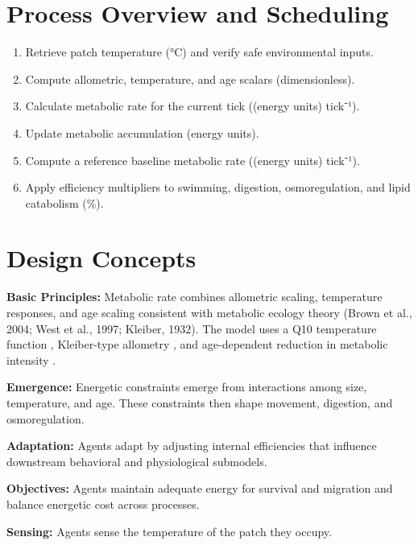 \documentclass[
]{book}
\begin{document}
\section{Process Overview and Scheduling}\label{process-overview-and-scheduling}

\begin{enumerate}
\def\labelenumi{\arabic{enumi}.}
\item
  Retrieve patch temperature (°C) and verify safe environmental
  inputs.
\item
  Compute allometric, temperature, and age scalars (dimensionless).
\item
  Calculate metabolic rate for the current tick ((energy units)
  tick⁻¹).
\item
  Update metabolic accumulation (energy units).
\item
  Compute a reference baseline metabolic rate ((energy units) tick⁻¹).
\item
  Apply efficiency multipliers to swimming, digestion, osmoregulation,
  and lipid catabolism (\%).
\end{enumerate}

\section{Design Concepts}\label{design-concepts}

\textbf{Basic Principles:} Metabolic rate combines allometric scaling,
temperature responses, and age scaling consistent with metabolic ecology
theory (Brown et al., 2004; West et al., 1997; Kleiber, 1932). The model
uses a Q10 temperature function \citep{schmidt_nielsen_animal_1997},
Kleiber-type allometry \citep{kleiber_body_1932, west_general_1997}, and
age-dependent reduction in metabolic intensity \citep{glazier_beyond_2005, glazier_relevance_2023}.

\textbf{Emergence:} Energetic constraints emerge from interactions among
size, temperature, and age. These constraints then shape movement,
digestion, and osmoregulation.

\textbf{Adaptation:} Agents adapt by adjusting internal efficiencies that
influence downstream behavioral and physiological submodels.

\textbf{Objectives:} Agents maintain adequate energy for survival and
migration and balance energetic cost across processes.

\textbf{Sensing:} Agents sense the temperature of the patch they occupy.
\end{document}
